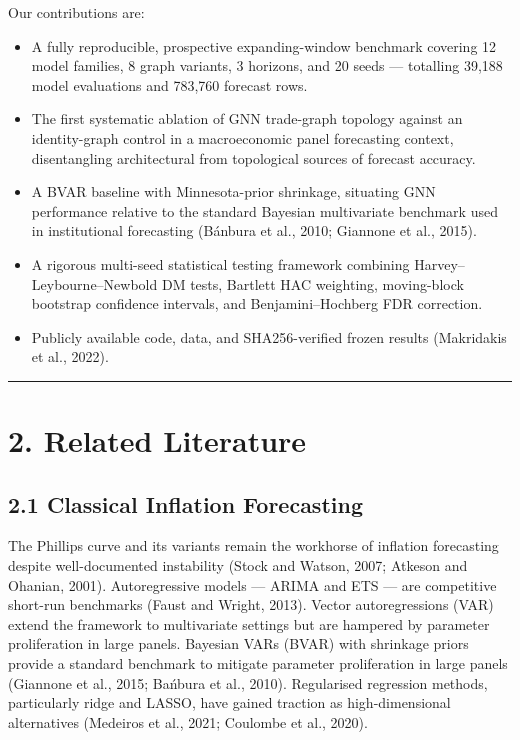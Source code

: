 \documentclass[
]{article}
\newcounter{none} %
\providecommand{\tightlist}{%
  \setlength{\itemsep}{0pt}\setlength{\parskip}{0pt}}
\begin{document}
Our contributions are:

\begin{itemize}
\tightlist
\item
  A fully reproducible, prospective expanding-window benchmark covering 12 model families, 8 graph variants, 3 horizons, and 20 seeds — totalling 39,188 model evaluations and 783,760 forecast rows.
\item
  The first systematic ablation of GNN trade-graph topology against an identity-graph control in a macroeconomic panel forecasting context, disentangling architectural from topological sources of forecast accuracy.
\item
  A BVAR baseline with Minnesota-prior shrinkage, situating GNN performance relative to the standard Bayesian multivariate benchmark used in institutional forecasting (Bánbura et al., 2010; Giannone et al., 2015).
\item
  A rigorous multi-seed statistical testing framework combining Harvey–Leybourne–Newbold DM tests, Bartlett HAC weighting, moving-block bootstrap confidence intervals, and Benjamini–Hochberg FDR correction.
\item
  Publicly available code, data, and SHA256-verified frozen results (Makridakis et al., 2022).
\end{itemize}

\begin{center}\rule{0.5\linewidth}{0.5pt}\end{center}

\section{2. Related Literature}\label{related-literature}

\subsection{2.1 Classical Inflation
Forecasting}\label{classical-inflation-forecasting}

The Phillips curve and its variants remain the workhorse of inflation
forecasting despite well-documented instability (Stock and Watson,
2007; Atkeson and Ohanian, 2001). Autoregressive models --- ARIMA and ETS --- are competitive
short-run benchmarks (Faust and Wright, 2013). Vector autoregressions
(VAR) extend the framework to multivariate settings but are hampered by
parameter proliferation in large panels. Bayesian VARs (BVAR) with shrinkage priors provide a standard benchmark to mitigate parameter proliferation in large panels (Giannone et al., 2015; Ba\'nbura et al., 2010). Regularised regression methods,
particularly ridge and LASSO, have gained traction as high-dimensional
alternatives (Medeiros et al., 2021; Coulombe et al., 2020).
\end{document}
